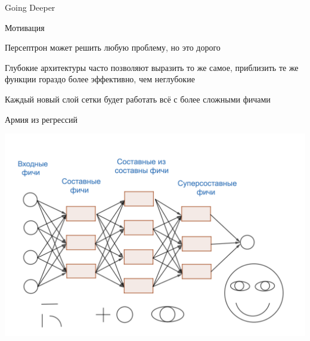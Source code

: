 \documentclass[notes,12pt, aspectratio=169]{beamer}
\newenvironment{wideitemize}{\itemize\addtolength{\itemsep}{10pt}}{\enditemize}
\begin{document}
{
	\begin{frame}[fragile]
	\vspace{6.5cm}
	\begin{center}
		{\color{white} \Huge{Going Deeper}}
	\end{center}
\end{frame}
}


\begin{frame}{Мотивация}
	\begin{wideitemize}
		\item Персептрон может решить любую проблему, но это дорого

		\item Глубокие архитектуры часто позволяют выразить то же самое, приблизить те же функции гораздо более эффективно, чем неглубокие

		\item Каждый новый слой сетки будет работать всё с более сложными фичами
	\end{wideitemize}
\end{frame}


\begin{frame}{Армия из регрессий}
	\begin{center}
		\includegraphics[width=0.73\paperwidth]{network_1.png}
	\end{center}
\end{frame}
\end{document}
